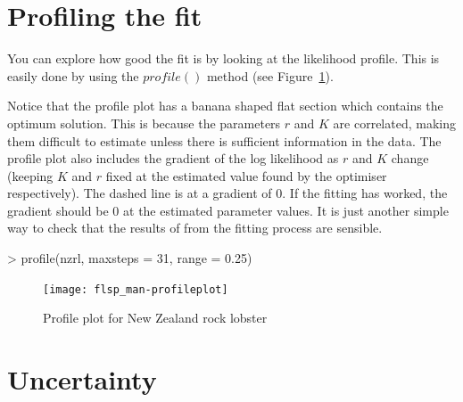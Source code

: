 \documentclass[a4paper]{article}
\begin{document}
\section{Profiling the fit}

You can explore how good the fit is by looking at the likelihood profile. This is easily done by using the $profile()$ method (see Figure~\ref{fig:profile_nzrl}).

Notice that the profile plot has a banana shaped flat section which contains the optimum solution. This is because the parameters $r$ and $K$ are correlated, making them difficult to estimate unless there is sufficient information in the data.
The profile plot also includes the gradient of the log likelihood as $r$ and $K$ change (keeping $K$ and $r$ fixed at the estimated value found by the optimiser respectively). The dashed line is at a gradient of 0. If the fitting has worked, the gradient should be 0 at the estimated parameter values. It is just another simple way to check that the results of from the fitting process are sensible.

\begin{center}
\begin{minipage}[H]{0.95\textwidth}%
\begin{shaded}%
\begin{Schunk}
\begin{Sinput}
> profile(nzrl, maxsteps = 31, range = 0.25)
\end{Sinput}
\end{Schunk}
\end{shaded}%
\end{minipage}
\end{center}

\begin{figure}
\begin{center}
\texttt{[image: flsp\_man-profileplot]}
\end{center}
\caption{Profile plot for New Zealand rock lobster}
\label{fig:profile_nzrl}
\end{figure}

\section{Uncertainty}




\end{document}
